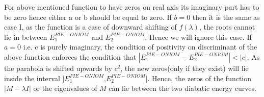 \begin{enumerate}
For above mentioned function to have zeros on real axis its imaginary part has to be zero hence
either a or b should be equal to zero. If $b = 0$ then it is the same as case I, as the function
is a case of downward shifting of $f(\lambda)$, the roots cannot lie in between $E^{PIE-ONIOM}_1$
and $E^{PIE-ONIOM}_2$. Hence we will ignore this case. If $a = 0$ i.e. c is purely imaginary, the
condition of positivity on discriminant of the above function enforces the condition that
$|E^{PIE-ONIOM}_1-E^{PIE-ONIOM}_2| < |c|$. As the parabola is shifted upwards by $c^2$,
the new zeros(only if they exist) will lie inside the interval [$E^{PIE-ONIOM}_1$,$E^{PIE-ONIOM}_2$].
Hence, the zeros of the function $|M - \lambda I|$ or the eigenvalues of $M$ can lie between the
two diabatic energy curves.
\end{enumerate}

\newpage
